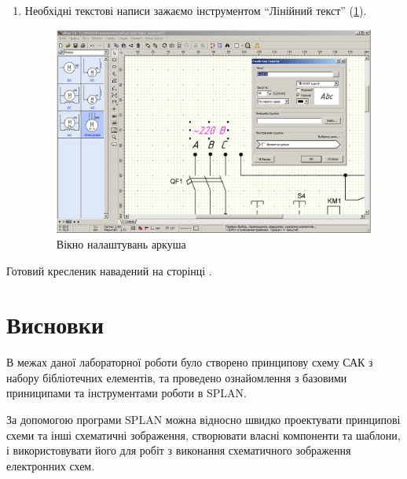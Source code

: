 \begin{enumerate}[leftmargin=*]
\item Необхідні текстові написи зажаємо інструментом ``Лінійний текст'' (\ref{fig:lab1:step4}).
  \begin{figure}[!ht]
    \centering \includegraphics[width=0.7\linewidth]{./images/lab1/step4.png}
    \caption{Вікно налаштувань аркуша}
    \label{fig:lab1:step4} 
  \end{figure}
  \FloatBarrier
\end{enumerate}

Готовий кресленик навадений на сторінці \pageref{lab1:pdf:drawing}.
\newpage
\NoBorder
\label{lab1:pdf:drawing}
 \BorderText

\section*{Висновки}

В межах даної лабораторної роботи було створено принципову схему САК з набору бібліотечних
елементів, та проведено ознайомлення з базовими приниципами та інструментами роботи в SPLAN.

За допомогою програми SPLAN можна відносно швидко проектувати принципові схеми та інші схематичні
зображення, створювати власні компоненти та шаблони, і використовувати його для робіт з виконання
схематичного зображення електронних схем.
